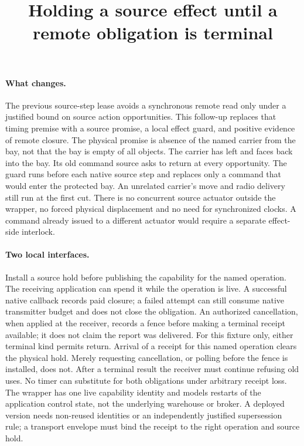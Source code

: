 \documentclass{article}
\title{Holding a source effect until a remote obligation is terminal}
\begin{document}
\maketitle

\paragraph{What changes.}
The previous source-step lease avoids a synchronous remote read only under
a justified bound on source action opportunities. This follow-up replaces
that timing premise with a source promise, a local effect guard, and
positive evidence of remote closure. The physical promise is absence of
the named carrier from the bay, not that the bay is empty of all objects.
The carrier has left and faces back into the bay. Its old command source
asks to return at every opportunity. The guard runs before each native
source step and replaces only a command that would enter the protected
bay. An unrelated carrier's move and radio delivery still run at the first
cut. There is no concurrent source actuator outside the wrapper, no forced
physical displacement and no need for synchronized clocks. A command
already issued to a different actuator would require a separate
effect-side interlock.

\paragraph{Two local interfaces.}
Install a source hold before publishing the capability for the named
operation. The receiving application can spend it while the operation is
live. A successful native callback records paid closure; a failed attempt
can still consume native transmitter budget and does not close the
obligation. An authorized cancellation, when applied at the receiver,
records a fence before making a terminal receipt available; it does not
claim the report was delivered. For this fixture only, either terminal
kind permits return. Arrival of a receipt for this named operation
clears the physical hold. Merely requesting cancellation, or polling
before the fence is installed, does not. After a terminal result the receiver
must continue refusing old uses. No timer can substitute for both obligations
under arbitrary receipt loss. The wrapper has one live capability identity
and models restarts of the application control state, not the underlying
warehouse or broker. A deployed version needs non-reused identities or
an independently justified supersession rule; a transport envelope must
bind the receipt to the right operation and source hold.
\end{document}
